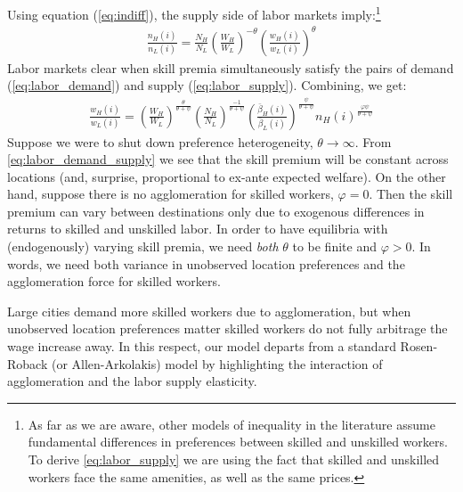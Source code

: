 \documentclass[12 pt]{article}
\begin{document}
Using equation (\ref{eq:indiff}), the supply side of labor markets imply:\footnote{As far as we are aware, other models of inequality in the literature assume fundamental differences in preferences between skilled and unskilled workers.  To derive \eqref{eq:labor_supply} we are using the fact that skilled and unskilled workers face the same amenities, as well as the same prices.}
\begin{eqnarray}\label{eq:labor_supply}
    \frac{n_H(i)}{n_L(i)} = \frac{N_H}{N_L} \left(\frac{W_H}{W_L} \right)^{-\theta}
    \left( \frac{w_H(i)}{w_L(i)}\right)^{\theta}
\end{eqnarray}
Labor markets clear when skill premia simultaneously satisfy the pairs of demand (\ref{eq:labor_demand}) and supply (\ref{eq:labor_supply}).  Combining, we get:
\begin{eqnarray}\label{eq:labor_demand_supply}
    \frac{w_H(i)}{w_L(i)} = \left(\frac{W_H}{W_L}\right)^{\frac{\theta}{\theta + \psi}}\left(\frac{N_H}{N_L}\right)^{\frac{-1}{\theta + \psi}} \left(\frac{\bar{\beta}_H(i)}{\bar{\beta}_L(i)}\right)^{\frac{\psi}{\theta + \psi}} n_H(i)^{\frac{\varphi \psi}{\theta + \psi}}
\end{eqnarray}
Suppose we were to shut down preference heterogeneity, $\theta \rightarrow \infty$.  From \eqref{eq:labor_demand_supply} we see that the skill premium will be constant across locations (and, surprise, proportional to ex-ante expected welfare).  On the other hand, suppose there is no agglomeration for skilled workers, $\varphi = 0$.  Then the skill premium can vary between destinations only due to exogenous differences in returns to skilled and unskilled labor.  In order to have equilibria with (endogenously) varying skill premia, we need \emph{both} $\theta$ to be finite and $\varphi >0$. In words, we need both variance in unobserved location preferences and the agglomeration force for skilled workers.  

Large cities demand more skilled workers due to agglomeration, but when unobserved location preferences matter skilled workers do not fully arbitrage the wage increase away. In this respect, our model departs from a standard Rosen-Roback (or Allen-Arkolakis) model by highlighting the interaction of agglomeration and the labor supply elasticity. 
\end{document}
